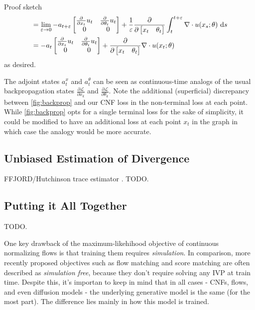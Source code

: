 \documentclass{scrartcl}
\begin{document}
\begin{proof*}{Proof sketch}
\begin{align*}
                        &= \lim_{\varepsilon \to 0} -a_{t+\varepsilon}\begin{bmatrix} \frac{\partial}{\partial x_t} u_t & \frac{\partial}{\partial \theta_t} u_t \\ 0 & 0 \end{bmatrix} + \frac{1}{\varepsilon} \frac{\partial}{\partial \begin{bmatrix} x_t & \theta_t \end{bmatrix}}\int_t^{t + \varepsilon} \nabla \cdot u(x_s; \theta)\, \d s\\
                        &= -a_t \begin{bmatrix} \frac{\partial}{\partial x_t} u_t & \frac{\partial}{\partial \theta_t} u_t \\ 0 & 0 \end{bmatrix} + \frac{\partial}{\partial \begin{bmatrix} x_t & \theta_t \end{bmatrix}} \nabla \cdot u(x_t; \theta)
    \end{align*}
    as desired.
\end{proof*}

\begin{remarkbox}
    The adjoint states $a_t^x$ and $a_t^\theta$ can be seen as continuous-time analogs of the usual backpropagation states $\frac{\partial \mathcal{L}}{\partial x_k}$ and $\frac{\partial \mathcal{L}}{\partial \theta_k}$. Note the additional (superficial) discrepancy between \cref{fig:backprop} and our CNF loss in the non-terminal loss at each point. While \cref{fig:backprop} opts for a single terminal loss for the sake of simplicity, it could be modified to have an additional loss at each point $x_t$ in the graph in which case the analogy would be more accurate.
\end{remarkbox}

\subsection{Unbiased Estimation of Divergence}
FFJORD/Hutchinson trace estimator \citep{ffjord}. TODO.

\subsection{Putting it All Together}
TODO.

\begin{remarkbox}
One key drawback of the maximum-likehihood objective of continuous normalizing flows is that training them requires \textit{simulation}. In comparison, more recently proposed objectives such as flow matching and score matching are often described as \textit{simulation free}, because they don't require solving any IVP at train time. Despite this, it's importan to keep in mind that in all cases - CNFs, flows, and even diffusion models - the underlying generative model is the same (for the most part).
The difference lies mainly in how this model is trained.
\end{remarkbox}

\end{document}
